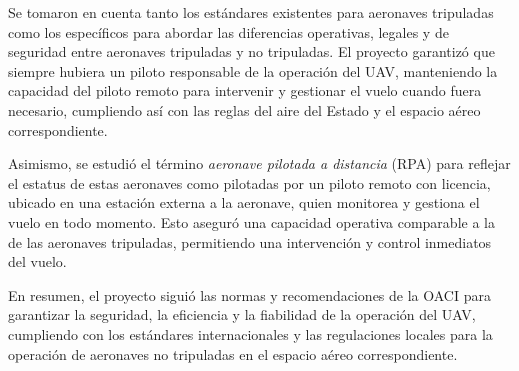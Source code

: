         Se tomaron en cuenta tanto los estándares existentes para aeronaves tripuladas como los específicos para abordar las diferencias operativas, legales y de seguridad entre aeronaves tripuladas y no tripuladas. El proyecto garantizó que siempre hubiera un piloto responsable de la operación del UAV, manteniendo la capacidad del piloto remoto para intervenir y gestionar el vuelo cuando fuera necesario, cumpliendo así con las reglas del aire del Estado y el espacio aéreo correspondiente.\vspace{5 px}

        Asimismo, se estudió el término \textit{aeronave pilotada a distancia} (RPA) para reflejar el estatus de estas aeronaves como pilotadas por un piloto remoto con licencia, ubicado en una estación externa a la aeronave, quien monitorea y gestiona el vuelo en todo momento. Esto aseguró una capacidad operativa comparable a la de las aeronaves tripuladas, permitiendo una intervención y control inmediatos del vuelo.\vspace{5 px}

        En resumen, el proyecto siguió las normas y recomendaciones de la OACI para garantizar la seguridad, la eficiencia y la fiabilidad de la operación del UAV, cumpliendo con los estándares internacionales y las regulaciones locales para la operación de aeronaves no tripuladas en el espacio aéreo correspondiente.\vspace{5 px}

